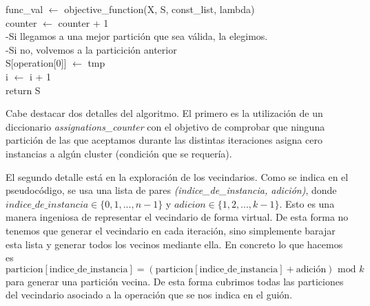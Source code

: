 \documentclass[11pt,a4paper]{article}
\begin{document}
\begin{algorithm}
{{{                    func\_val $\leftarrow$ objective\_function(X, S, const\_list, lambda) \\
                    counter $\leftarrow$ counter + 1 \\
                    -Si llegamos a una mejor partición que sea válida, la elegimos. \\
                    {
                    -Si no, volvemos a la particición anterior \\
                        S[operation[0]] $\leftarrow$ tmp  \\
                    }
                    i $\leftarrow$ i + 1 \\
	 	        }
	 	    }
	 		return S \\
	 	}
	\end{algorithm}

    Cabe destacar dos detalles del algoritmo. El primero es la utilización de un diccionario \textit{assignations\_counter} con el objetivo de comprobar que ninguna partición de las que aceptamos durante las distintas iteraciones asigna cero instancias a algún cluster (condición que se requería).
    
    El segundo detalle está en la exploración de los vecindarios. Como se indica en el pseudocódigo, se usa una lista de pares \textit{(indice\_de\_instancia, adición)}, donde $indice\_de\_instancia \in \{0,1,...,n-1\}$ y $adicion \in \{1,2,...,k-1\}$. Esto es una manera ingeniosa de representar el vecindario de forma virtual. De esta forma no tenemos que generar el vecindario en cada iteración, sino simplemente barajar esta lista y generar todos los vecinos mediante ella. En concreto lo que hacemos es
    $$\text{particion}[\text{indice\_de\_instancia}]= (\text{particion}[\text{indice\_de\_instancia}] + \text{adición}) \text{ mod } k$$
    para generar una partición vecina. De esta forma cubrimos todas las particiones del vecindario asociado a la operación que se nos indica en el guión.
	
\end{document}
